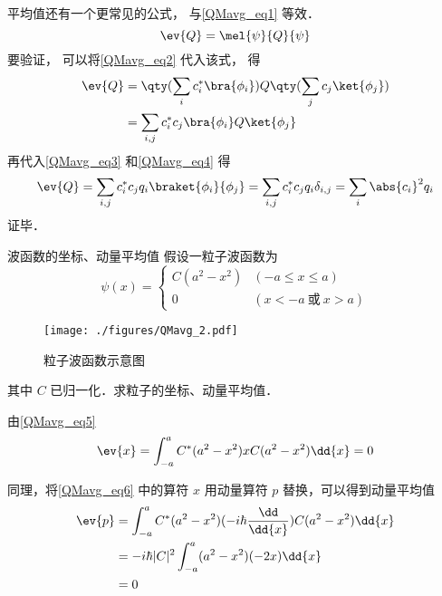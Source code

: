 平均值还有一个更常见的公式， 与\autoref{QMavg_eq1} 等效．
\begin{equation}\label{QMavg_eq5}
\ev{Q} = \mel{\psi}{Q}{\psi}
\end{equation}
要验证， 可以将\autoref{QMavg_eq2} 代入该式， 得
\begin{equation}
\begin{aligned}
\ev{Q} &= \qty(\sum_i c_i^* \bra{\phi_i}) Q \qty(\sum_j c_j \ket{\phi_j})\\
&= \sum_{i,j} c_i^* c_j \bra{\phi_i} Q \ket{\phi_j}
\end{aligned} 
\end{equation}
再代入\autoref{QMavg_eq3} 和\autoref{QMavg_eq4} 得
\begin{equation}
\ev{Q} = \sum_{i,j} c_i^* c_j q_i \braket{\phi_i}{\phi_j}
= \sum_{i,j} c_i^* c_j q_i \delta_{i,j} = \sum_i \abs{c_i}^2 q_i
\end{equation}
证毕．

\begin{example}{波函数的坐标、动量平均值}
假设一粒子波函数为
\begin{equation}
\psi(x)=
\begin{cases}
C(a^2-x^2) &(-a\leqslant x\leqslant a)\\
0 &(x<-a \ \text{或}\ x>a) 
\end{cases}
\end{equation}
\begin{figure}[ht]
\centering
\texttt{[image: ./figures/QMavg\_2.pdf]}
\caption{粒子波函数示意图} \label{QMavg_fig2}
\end{figure}
其中 $C$ 已归一化．求粒子的坐标、动量平均值．

由\autoref{QMavg_eq5} 
\begin{equation}\label{QMavg_eq6}
\ev{x}= \int_{-a}^a C^*(a^2-x^2)xC(a^2-x^2)\dd{x} = 0
\end{equation}

同理，将\autoref{QMavg_eq6} 中的算符 $x$ 用动量算符 $p$ 替换，可以得到动量平均值
\begin{equation}
\begin{aligned}
\ev{p} &= \int_{-a}^a C^*(a^2-x^2)(-i\hbar\frac{\dd}{\dd{x}})C(a^2-x^2)\dd{x}\\
&= -i\hbar |C|^2\int_{-a}^a (a^2-x^2)(-2x)\dd{x}\\
&= 0
\end{aligned}
\end{equation}
\end{example}






